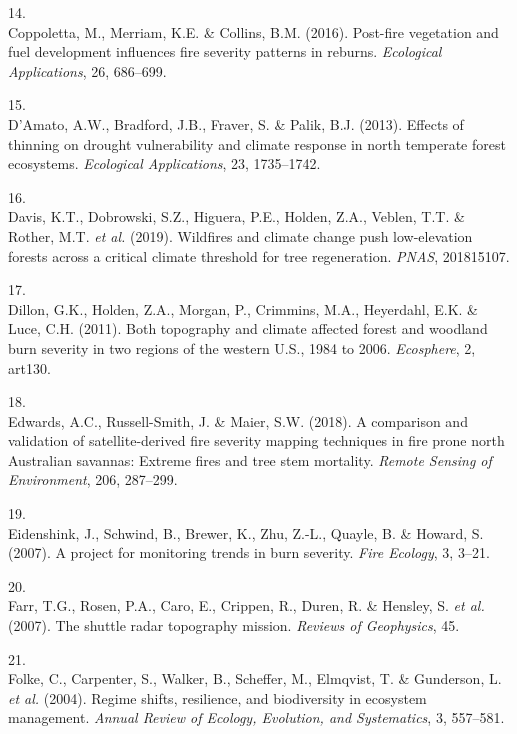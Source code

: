 \documentclass[]{article}
\begin{document}
\leavevmode\hypertarget{ref-coppoletta2016}{}%
14.\\
Coppoletta, M., Merriam, K.E. \& Collins, B.M. (2016). Post-fire
vegetation and fuel development influences fire severity patterns in
reburns. \emph{Ecological Applications}, 26, 686--699.

\leavevmode\hypertarget{ref-damato2013}{}%
15.\\
D'Amato, A.W., Bradford, J.B., Fraver, S. \& Palik, B.J. (2013). Effects
of thinning on drought vulnerability and climate response in north
temperate forest ecosystems. \emph{Ecological Applications}, 23,
1735--1742.

\leavevmode\hypertarget{ref-davis2019a}{}%
16.\\
Davis, K.T., Dobrowski, S.Z., Higuera, P.E., Holden, Z.A., Veblen, T.T.
\& Rother, M.T. \emph{et al.} (2019). Wildfires and climate change push
low-elevation forests across a critical climate threshold for tree
regeneration. \emph{PNAS}, 201815107.

\leavevmode\hypertarget{ref-dillon2011}{}%
17.\\
Dillon, G.K., Holden, Z.A., Morgan, P., Crimmins, M.A., Heyerdahl, E.K.
\& Luce, C.H. (2011). Both topography and climate affected forest and
woodland burn severity in two regions of the western U.S., 1984 to 2006.
\emph{Ecosphere}, 2, art130.

\leavevmode\hypertarget{ref-edwards2018}{}%
18.\\
Edwards, A.C., Russell-Smith, J. \& Maier, S.W. (2018). A comparison and
validation of satellite-derived fire severity mapping techniques in fire
prone north Australian savannas: Extreme fires and tree stem mortality.
\emph{Remote Sensing of Environment}, 206, 287--299.

\leavevmode\hypertarget{ref-eidenshink2007}{}%
19.\\
Eidenshink, J., Schwind, B., Brewer, K., Zhu, Z.-L., Quayle, B. \&
Howard, S. (2007). A project for monitoring trends in burn severity.
\emph{Fire Ecology}, 3, 3--21.

\leavevmode\hypertarget{ref-farr2007}{}%
20.\\
Farr, T.G., Rosen, P.A., Caro, E., Crippen, R., Duren, R. \& Hensley, S.
\emph{et al.} (2007). The shuttle radar topography mission.
\emph{Reviews of Geophysics}, 45.

\leavevmode\hypertarget{ref-folke2004}{}%
21.\\
Folke, C., Carpenter, S., Walker, B., Scheffer, M., Elmqvist, T. \&
Gunderson, L. \emph{et al.} (2004). Regime shifts, resilience, and
biodiversity in ecosystem management. \emph{Annual Review of Ecology,
Evolution, and Systematics}, 3, 557--581.
\end{document}
